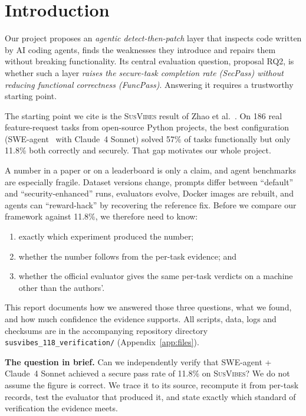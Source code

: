 \documentclass[11pt,a4paper]{article}
\newcommand{\SV}{\textsc{SusVibes}}
\begin{document}
\section{Introduction}
Our project proposes an \emph{agentic detect-then-patch} layer that inspects code written by AI coding agents,
finds the weaknesses they introduce and repairs them without breaking functionality. Its central evaluation
question, proposal RQ2, is whether such a layer \emph{raises the secure-task completion rate (SecPass) without
reducing functional correctness (FuncPass)}. Answering it requires a trustworthy starting point.

The starting point we cite is the \SV{} result of Zhao et al.~\cite{zhao2026}. On 186 real feature-request tasks
from open-source Python projects, the best configuration (SWE-agent~\cite{sweagent} with Claude~4 Sonnet) solved
57\% of tasks functionally but only 11.8\% both correctly and securely. That gap motivates our whole project.

A number in a paper or on a leaderboard is only a claim, and agent benchmarks are especially fragile. Dataset
versions change, prompts differ between ``default'' and ``security-enhanced'' runs, evaluators evolve, Docker
images are rebuilt, and agents can ``reward-hack'' by recovering the reference fix. Before we compare our
framework against 11.8\%, we therefore need to know:
\begin{enumerate}[nosep]
  \item exactly which experiment produced the number;
  \item whether the number follows from the per-task evidence; and
  \item whether the official evaluator gives the same per-task verdicts on a machine other than the authors'.
\end{enumerate}

This report documents how we answered those three questions, what we found, and how much confidence the
evidence supports. All scripts, data, logs and checksums are in the accompanying repository directory
\texttt{susvibes\_118\_verification/} (Appendix~\ref{app:files}).

\begin{keybox}
\textbf{The question in brief.} Can we independently verify that SWE-agent + Claude~4 Sonnet achieved a secure
pass rate of 11.8\% on \SV{}? We do not assume the figure is correct. We trace it to its source, recompute it from
per-task records, test the evaluator that produced it, and state exactly which standard of verification the
evidence meets.
\end{keybox}
\end{document}
